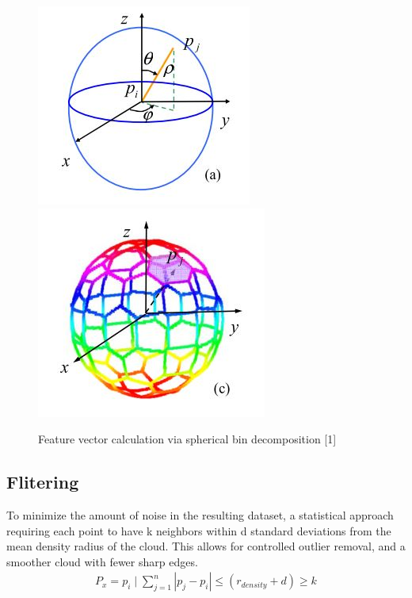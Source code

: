 \documentclass[12pt]{drexelthesis}
\begin{document}
\begin{figure}
\centering
\includegraphics{ISSfeaturevector2.jpg}  \includegraphics{ISSfeaturevector.jpg}
\caption[Intrinsic Shape Signature feature vectors]{Feature vector calculation via spherical bin decomposition [1]}
\end{figure}

\subsection{Flitering}
To minimize the amount of noise in the resulting dataset, a statistical approach requiring each point to have k neighbors within d standard deviations from the mean density radius of the cloud. This allows for controlled outlier removal, and a smoother cloud with fewer sharp edges.
\begin{gather*}
	P_{x} = p_{i} \mid \sum_{j=1}^n |p_{j} - p_{i}| \leq (r_{density} + d) \geq k
\end{gather*}
\end{document}
